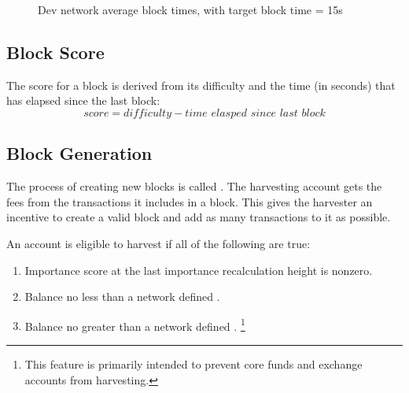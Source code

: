 \begin{figure}
	\caption{Dev network average block times, with target block time = 15s}
\end{figure}

\subsection{Block Score}

The score for a block is derived from its difficulty and the time (in seconds) that has elapsed since the last block:
\begin{equation}
\tag{block score} \mathit{score} = \mathit{difficulty} - \textit{time elasped since last block}
\end{equation}

\subsection{Block Generation}
\label{sec:blockchain:generation}

The process of creating new blocks is called .
The harvesting account gets the fees from the transactions it includes in a block.
This gives the harvester an incentive to create a valid block and add as many transactions to it as possible.

An account is eligible to harvest if all of the following are true:
\begin{enumerate}
\item{Importance score at the last importance recalculation height is nonzero.}
\item{Balance no less than a network defined .}
\item{Balance no greater than a network defined .}
\footnote{This feature is primarily intended to prevent core funds and exchange accounts from harvesting.}
\end{enumerate}

